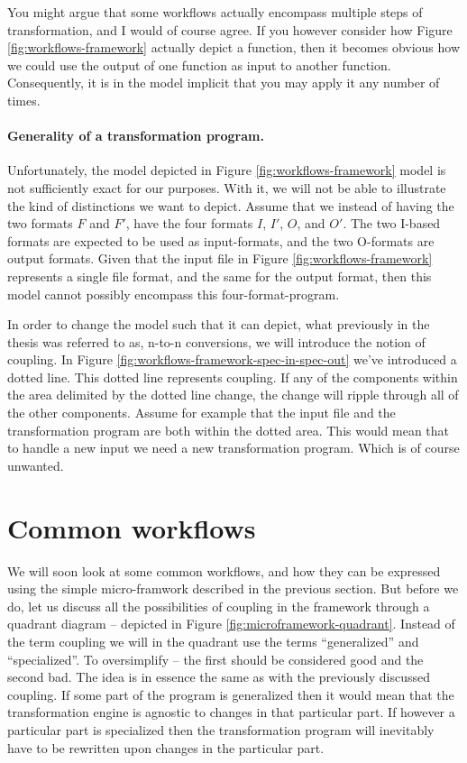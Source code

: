 \documentclass{scrreprt}
\begin{document}
You might argue that some workflows actually encompass multiple steps of transformation, and I would of course agree. If you however consider how Figure \ref{fig:workflows-framework} actually depict a function, then it becomes obvious how we could use the output of one function as input to another function. Consequently, it is in the model implicit that you may apply it any number of times.




\paragraph{Generality of a transformation program.}
Unfortunately, the model depicted in Figure \ref{fig:workflows-framework} model is not sufficiently exact for our purposes. With it, we will not be able to illustrate the kind of distinctions we want to depict. Assume that we instead of having the two formats \(F\) and \(F\prime\), have the four formats \(I\), \(I\prime\), \(O\), and \(O\prime\). The two I-based formats are expected to be used as input-formats, and the two O-formats are output formats. Given that the input file in Figure \ref{fig:workflows-framework} represents a single file format, and the same for the output format, then this model cannot possibly encompass this four-format-program.

In order to change the model such that it can depict, what previously in the thesis was referred to as, n-to-n conversions, we will introduce the notion of coupling. In Figure \ref{fig:workflows-framework-spec-in-spec-out} we've introduced a dotted line. This dotted line represents coupling. If any of the components within the area delimited by the dotted line change, the change will ripple through all of the other components. Assume for example that the input file and the transformation program are both within the dotted area. This would mean that to handle a new input we need a new transformation program. Which is of course unwanted.







\section{Common workflows}
We will soon look at some common workflows, and how they can be expressed using the simple micro-framwork described in the previous section. But before we do, let us discuss all the possibilities of coupling in the framework through a quadrant diagram -- depicted in Figure \ref{fig:microframework-quadrant}. Instead of the term coupling we will in the quadrant use the terms ``generalized'' and ``specialized''. To oversimplify -- the first should be considered good and the second bad. The idea is in essence the same as with the previously discussed coupling. If some part of the program is generalized then it would mean that the transformation engine is agnostic to changes in that particular part. If however a particular part is specialized then the transformation program will inevitably have to be rewritten upon changes in the particular part. 
\end{document}
